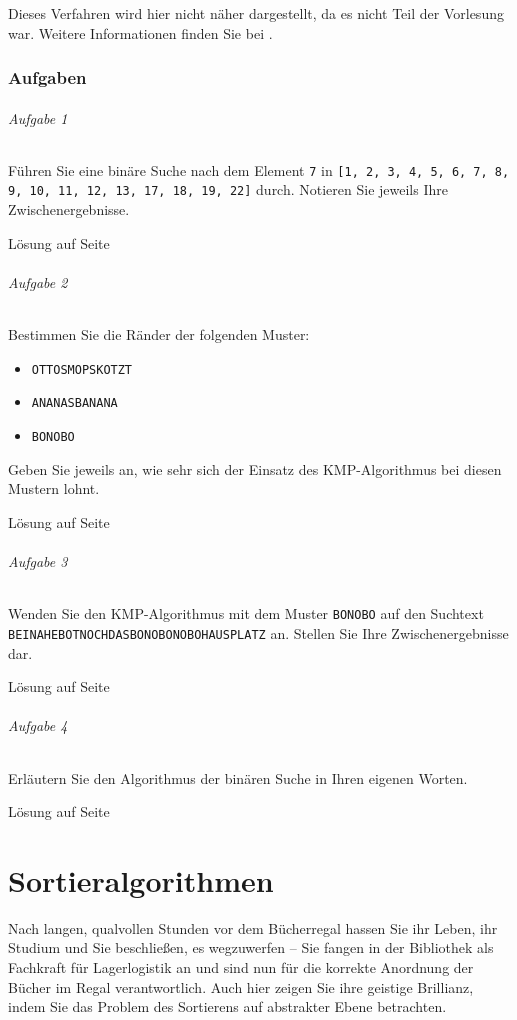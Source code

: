 \documentclass[11pt,a4paper]{scrartcl}
\begin{document}
Dieses Verfahren wird hier nicht näher dargestellt, da es nicht Teil der Vorlesung war. Weitere Informationen finden Sie bei \parencite[][S. 476 -- 478]{Grundkurs}.
\pagebreak
\section*{Aufgaben}
\paragraph{Aufgabe 1} Führen Sie eine binäre Suche nach dem Element \texttt{7} in \texttt{[1, 2, 3, 4, 5, 6, 7, 8, 9, 10, 11, 12, 13, 17, 18, 19, 22]} durch. Notieren Sie jeweils Ihre Zwischenergebnisse. 
\begin{flushright}
Lösung auf Seite \pageref{a2.1:lsg}
\end{flushright}
\paragraph{Aufgabe 2} Bestimmen Sie die Ränder der folgenden Muster:
\begin{itemize}
\item \texttt{OTTOSMOPSKOTZT}
\item \texttt{ANANASBANANA}
\item \texttt{BONOBO}
\end{itemize}
Geben Sie jeweils an, wie sehr sich der Einsatz des KMP-Algorithmus bei diesen Mustern lohnt.
\begin{flushright}
Lösung auf Seite \pageref{a2.2:lsg}
\end{flushright}
\paragraph{Aufgabe 3} Wenden Sie den KMP-Algorithmus mit dem Muster \texttt{BONOBO} auf den Suchtext \texttt{BEINAHEBOTNOCHDASBONOBONOBOHAUSPLATZ} an. Stellen Sie Ihre Zwischenergebnisse dar.
\begin{flushright}
Lösung auf Seite \pageref{a2.3:lsg}
\end{flushright}
\paragraph{Aufgabe 4} Erläutern Sie den Algorithmus der binären Suche in Ihren eigenen Worten.
\begin{flushright}
Lösung auf Seite \pageref{a2.4:lsg}
\end{flushright}
\pagebreak
\part{Sortieralgorithmen}
Nach langen, qualvollen Stunden vor dem Bücherregal hassen Sie ihr Leben, ihr Studium und Sie beschließen, es wegzuwerfen -- Sie fangen in der Bibliothek als Fachkraft für Lagerlogistik an und sind nun für die korrekte Anordnung der Bücher im Regal verantwortlich. Auch hier zeigen Sie ihre geistige Brillianz, indem Sie das Problem des Sortierens auf abstrakter Ebene betrachten.
\end{document}
